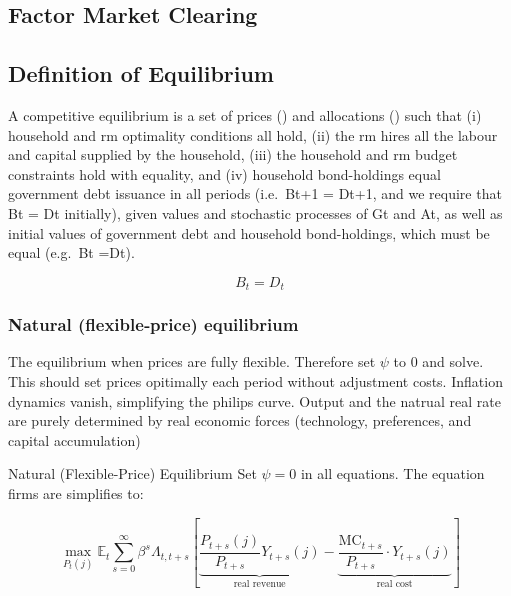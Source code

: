 \documentclass[11pt,preprint]{elsarticle}
\numberwithin{equation}{section}
\numberwithin{figure}{section}
\numberwithin{table}{section}
\begin{document}
\subsection{Factor Market Clearing}\label{factor-market-clearing}

\subsection{Definition of Equilibrium}\label{definition-of-equilibrium}

A competitive equilibrium is a set of prices () and allocations () such
that (i) household and rm optimality conditions all hold, (ii) the rm
hires all the labour and capital supplied by the household, (iii) the
household and rm budget constraints hold with equality, and (iv)
household bond-holdings equal government debt issuance in all periods
(i.e.~Bt+1 = Dt+1, and we require that Bt = Dt initially), given values
and stochastic processes of Gt and At, as well as initial values of
government debt and household bond-holdings, which must be equal
(e.g.~Bt =Dt).

\begin{equation}
B_t = D_t
\label{Bond_market_clear}
\end{equation}

\subsubsection{Natural (flexible‐price)
equilibrium}\label{natural-flexibleprice-equilibrium}

The equilibrium when prices are fully flexible. Therefore set \(\psi\)
to 0 and solve. This should set prices opitimally each period without
adjustment costs. Inflation dynamics vanish, simplifying the philips
curve. Output and the natrual real rate are purely determined by real
economic forces (technology, preferences, and capital accumulation)

Natural (Flexible-Price) Equilibrium Set \(\psi = 0\) in all equations.
The equation firms are simplifies to:

\begin{equation}
\max_{P_t(j)} \mathbb{E}_t \sum_{s=0}^{\infty} \beta^s \Lambda_{t,t+s} \left[
\underbrace{\frac{P_{t+s}(j)}{P_{t+s}} Y_{t+s}(j)}_{\text{real revenue}} 
- \underbrace{\frac{\text{MC}_{t+s}}{P_{t+s}} \cdot Y_{t+s}(j)}_{\text{real cost}} 
\right]
\label{intermediate_objective_frictionless}
\end{equation}
\end{document}
